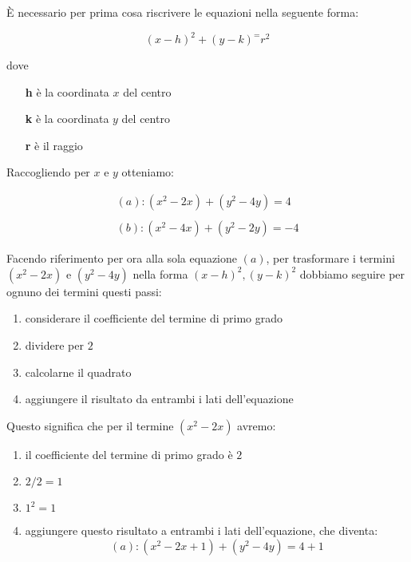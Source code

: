 È necessario per prima cosa riscrivere le equazioni nella seguente forma:

\begin{equation*}
(x-h)^2+(y-k)^=r^2
\end{equation*}

dove 
\begin{itemize}
\item[\textbf{h}] è la coordinata $x$ del centro
\item[\textbf{k}] è la coordinata $y$ del centro
\item[\textbf{r}] è il raggio
\end{itemize}

Raccogliendo per $x$ e $y$ otteniamo: 

\begin{equation*}
\begin{split}
(a): (x^2-2x)+(y^2-4y)=4 \\
\\
(b): (x^2-4x)+(y^2-2y)=-4
\end{split}
\end{equation*}

Facendo riferimento per ora alla sola equazione $(a)$, per trasformare
i termini $(x^2-2x)$ e $(y^2-4y)$ nella forma $(x-h)^2, (y-k)^2$ dobbiamo
seguire per ognuno dei termini questi passi:

\begin{enumerate}
\item considerare il coefficiente del termine di primo grado
\item dividere per $2$
\item calcolarne il quadrato
\item aggiungere il risultato da entrambi i lati dell'equazione
\end{enumerate}

Questo significa che per il termine $(x^2-2x)$ avremo:

\begin{enumerate}
\item il coefficiente del termine di primo grado è $2$
\item $2/2=1$
\item $1^2=1$
\item aggiungere questo risultato a entrambi i lati dell'equazione, che diventa:
\begin{equation*}
(a): (x^2-2x+1)+(y^2-4y)=4+1
\end{equation*}
\end{enumerate}

